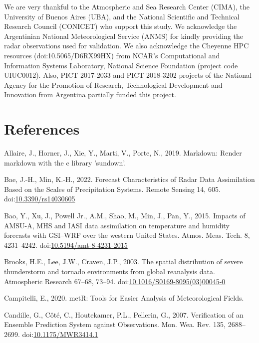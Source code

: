 \documentclass[final,5p,times,twocolumn,authoryear]{elsarticle} %
\begin{document}
We are very thankful to the Atmospheric and Sea Research Center (CIMA), the University of Buenos Aires (UBA), and the National Scientific and Technical Research Council (CONICET) who support this study. We acknowledge the Argentinian National Meteorological Service (ANMS) for kindly providing the radar observations used for validation. We also acknowledge the Cheyenne HPC resources (doi:10.5065/D6RX99HX) from NCAR's Computational and Information Systems Laboratory, National Science Foundation (project code UIUC0012). Also, PICT 2017-2033 and PICT 2018-3202 projects of the National Agency for the Promotion of Research, Technological Development and Innovation from Argentina partially funded this project.

\hypertarget{references}{%
\section*{References}\label{references}}

\hypertarget{refs}{}
\leavevmode\hypertarget{ref-allaire2019}{}%
Allaire, J., Horner, J., Xie, Y., Marti, V., Porte, N., 2019. Markdown: Render markdown with the c library 'sundown'.

\leavevmode\hypertarget{ref-bae2022}{}%
Bae, J.-H., Min, K.-H., 2022. Forecast Characteristics of Radar Data Assimilation Based on the Scales of Precipitation Systems. Remote Sensing 14, 605. doi:\href{https://doi.org/10.3390/rs14030605}{10.3390/rs14030605}

\leavevmode\hypertarget{ref-bao2015}{}%
Bao, Y., Xu, J., Powell Jr., A.M., Shao, M., Min, J., Pan, Y., 2015. Impacts of AMSU-A, MHS and IASI data assimilation on temperature and humidity forecasts with GSI--WRF over the western United States. Atmos. Meas. Tech. 8, 4231--4242. doi:\href{https://doi.org/10.5194/amt-8-4231-2015}{10.5194/amt-8-4231-2015}

\leavevmode\hypertarget{ref-brooks2003}{}%
Brooks, H.E., Lee, J.W., Craven, J.P., 2003. The spatial distribution of severe thunderstorm and tornado environments from global reanalysis data. Atmospheric Research 67--68, 73--94. doi:\href{https://doi.org/10.1016/S0169-8095(03)00045-0}{10.1016/S0169-8095(03)00045-0}

\leavevmode\hypertarget{ref-campitelli2020}{}%
Campitelli, E., 2020. metR: Tools for Easier Analysis of Meteorological Fields.

\leavevmode\hypertarget{ref-candille2007}{}%
Candille, G., Côté, C., Houtekamer, P.L., Pellerin, G., 2007. Verification of an Ensemble Prediction System against Observations. Mon. Wea. Rev. 135, 2688--2699. doi:\href{https://doi.org/10.1175/MWR3414.1}{10.1175/MWR3414.1}
\end{document}
